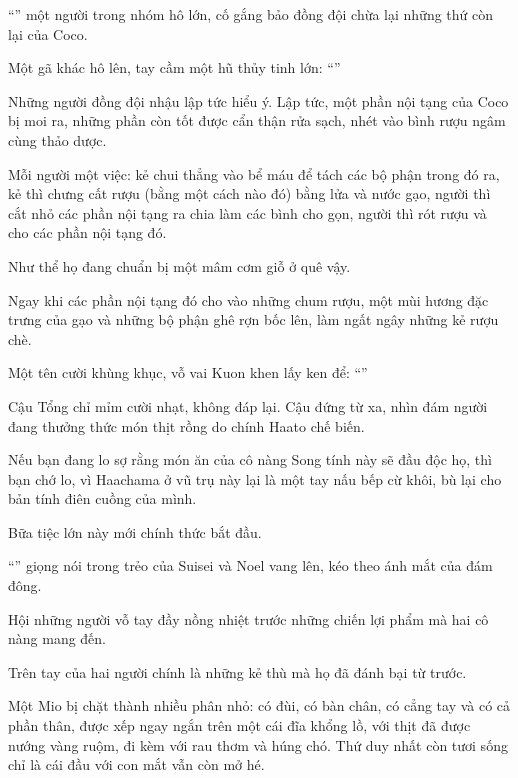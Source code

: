 \documentclass[../main.tex]{subfiles}
\begin{document}
``'' một người trong nhóm hô lớn, cố gắng bảo đồng đội chừa lại những thứ còn lại của Coco.

Một gã khác hô lên, tay cầm một hũ thủy tinh lớn: ``''

Những người đồng đội nhậu lập tức hiểu ý. Lập tức, một phần nội tạng của Coco bị moi ra, những phần còn tốt được cẩn thận rửa sạch, nhét vào bình rượu ngâm cùng thảo dược.

Mỗi người một việc: kẻ chui thẳng vào bể máu để tách các bộ phận trong đó ra, kẻ thì chưng cất rượu (bằng một cách nào đó) bằng lửa và nước gạo, người thì cắt nhỏ các phần nội tạng ra chia làm các bình cho gọn, người thì rót rượu và cho các phần nội tạng đó.

Như thể họ đang chuẩn bị một mâm cơm giỗ ở quê vậy.

Ngay khi các phần nội tạng đó cho vào những chum rượu, một mùi hương đặc trưng của gạo và những bộ phận ghê rợn bốc lên, làm ngất ngây những kẻ rượu chè.

Một tên cười khùng khục, vỗ vai Kuon khen lấy ken để: ``''

Cậu Tổng chỉ mỉm cười nhạt, không đáp lại. Cậu đứng từ xa, nhìn đám người đang thưởng thức món thịt rồng do chính Haato chế biến.

Nếu bạn đang lo sợ rằng món ăn của cô nàng Song tính này sẽ đầu độc họ, thì bạn chớ lo, vì Haachama ở vũ trụ này lại là một tay nấu bếp cừ khôi, bù lại cho bản tính điên cuồng của mình.

Bữa tiệc lớn này mới chính thức bắt đầu.

``'' giọng nói trong trẻo của Suisei và Noel vang lên, kéo theo ánh mắt của đám đông.

Hội những người vỗ tay đầy nồng nhiệt trước những chiến lợi phẩm mà hai cô nàng mang đến.

Trên tay của hai người chính là những kẻ thù mà họ đã đánh bại từ trước.

Một Mio bị chặt thành nhiều phân nhỏ: có đùi, có bàn chân, có cẳng tay và có cả phần thân, được xếp ngay ngắn trên một cái đĩa khổng lồ, với thịt đã được nướng vàng ruộm, đi kèm với rau thơm và húng chó. Thứ duy nhất còn tươi sống chỉ là cái đầu với con mắt vẫn còn mở hé.
\end{document}
